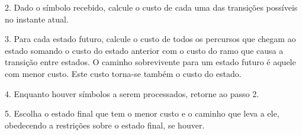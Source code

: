 2. Dado o símbolo recebido, calcule o custo de cada uma das transições possíveis no instante atual.

3. Para cada estado futuro, calcule o custo de todos os percursos que chegam ao estado somando o custo do estado anterior com o custo do ramo que causa a transição entre estados. O caminho sobrevivente para um estado futuro é aquele com menor custo. Este custo torna-se também o custo do estado.

4. Enquanto houver símbolos a serem processados, retorne ao passo 2.

5. Escolha o estado final que tem o menor custo e o caminho que leva a ele, obedecendo a restrições sobre o estado final, se houver.